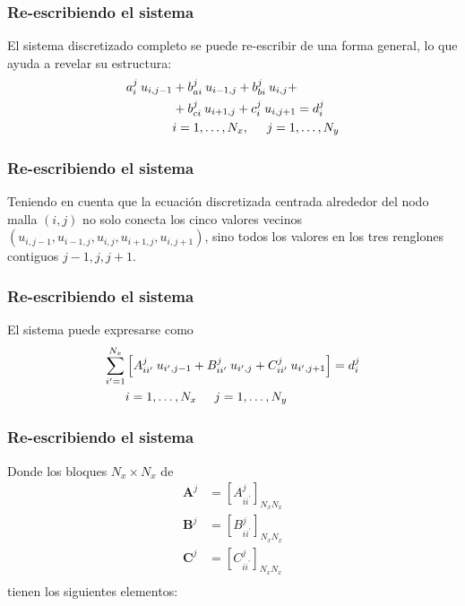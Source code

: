\documentclass[12pt]{beamer}
\begin{document}
\begin{frame}
\frametitle{Re-escribiendo el sistema}
El sistema discretizado completo se puede re-escribir de una forma general, lo que ayuda a revelar su estructura:
\begin{equation}
\begin{aligned}
a_{i}^{j} \: u_{i, j-1} &+ b_{ai}^{j} \: u_{i-1, j} + b_{bi}^{j} \: u_{i, j} + \\
&+ b_{ci}^{j} \: u_{i+1, j} + c_{i}^{j} \: u_{i, j+1} = d_{i}^{j} \\
&i = 1, \ldots, N_{x}, \hspace{0.5cm} j = 1, \ldots, N_{y}
\end{aligned}
\label{eq:ecuacion_13_14}
\end{equation}
\end{frame}
\begin{frame}
\frametitle{Re-escribiendo el sistema}
Teniendo en cuenta que la ecuación discretizada centrada alrededor del nodo malla $(i, j)$ no solo conecta los cinco valores vecinos $(u_{i, j-1}, u_{i-1, j}, u_{i,j}, u_{i+1, j}, u_{i, j+1})$, sino todos los valores en los tres renglones contiguos $j-1, j, j+1$.
\end{frame}
\begin{frame}
\frametitle{Re-escribiendo el sistema}
 El sistema puede expresarse como
\begin{equation}
\begin{aligned}
\sum_{i^{\prime} = 1}^{N_{x}} &\left[ A_{ii^{\prime}}^{j} \: u_{i^{\prime}, j-1} + B_{ii^{\prime}}^{j} \: u_{i^{\prime}, j} + C_{ii^{\prime}}^{j} \: u_{i^{\prime}, j+1}  \right] = d_{i}^{j} \\
&i = 1, \ldots, N_{x} \hspace{0.5cm} j = 1, \ldots, N_{y}
\end{aligned}
\label{eq:ecuacion_13_15}
\end{equation}
\end{frame}
\begin{frame}
\frametitle{Re-escribiendo el sistema}
Donde los bloques $N_{x} \times N_{x}$ de
\begin{align*}
\mathbf{A}^{j} &= [A_{ii^{\prime}}^{j}]_{N_{x} N_{x}} \\
\mathbf{B}^{j} &= [B_{ii^{\prime}}^{j}]_{N_{x} N_{x}} \\
\mathbf{C}^{j} &= [C_{ii^{\prime}}^{j}]_{N_{x} N_{x}} \\
\end{align*}   
tienen los siguientes elementos:
\end{frame}
\end{document}
